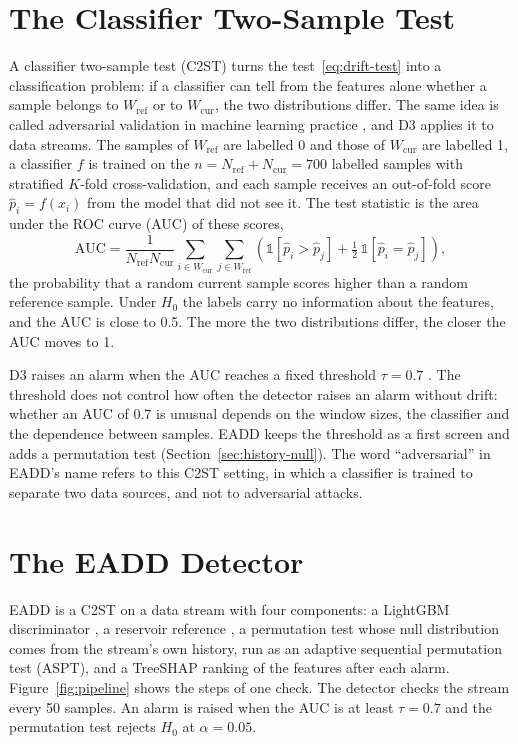 \section{The Classifier Two-Sample Test}
\label{sec:c2st}
A classifier two-sample test (C2ST) \citep{LopezPazOquab2017} turns the test~\eqref{eq:drift-test} into a classification problem: if a classifier can tell from the features alone whether a sample belongs to $W_{\mathrm{ref}}$ or to $W_{\mathrm{cur}}$, the two distributions differ. The same idea is called adversarial validation in machine learning practice \citep{Pan2020}, and D3 \citep{Gozuacik2019} applies it to data streams. The samples of $W_{\mathrm{ref}}$ are labelled 0 and those of $W_{\mathrm{cur}}$ are labelled 1, a classifier $f$ is trained on the $n = N_{\mathrm{ref}} + N_{\mathrm{cur}} = 700$ labelled samples with stratified $K$-fold cross-validation, and each sample receives an out-of-fold score $\hat{p}_i = f(x_i)$ from the model that did not see it. The test statistic is the area under the ROC curve (AUC) of these scores,
\begin{equation}
\mathrm{AUC} = \frac{1}{N_{\mathrm{ref}} N_{\mathrm{cur}}} \sum_{i \in W_{\mathrm{cur}}} \sum_{j \in W_{\mathrm{ref}}} \left( \mathbb{1}[\hat{p}_i > \hat{p}_j] + \tfrac{1}{2}\,\mathbb{1}[\hat{p}_i = \hat{p}_j] \right),
\label{eq:auc}
\end{equation}
the probability that a random current sample scores higher than a random reference sample. Under $H_0$ the labels carry no information about the features, and the AUC is close to 0.5. The more the two distributions differ, the closer the AUC moves to 1.

D3 raises an alarm when the AUC reaches a fixed threshold $\tau = 0.7$ \citep{Gozuacik2019}. The threshold does not control how often the detector raises an alarm without drift: whether an AUC of 0.7 is unusual depends on the window sizes, the classifier and the dependence between samples. EADD keeps the threshold as a first screen and adds a permutation test (Section~\ref{sec:history-null}). The word ``adversarial'' in EADD's name refers to this C2ST setting, in which a classifier is trained to separate two data sources, and not to adversarial attacks.

\section{The EADD Detector}
\label{sec:eadd}
EADD is a C2ST on a data stream with four components: a LightGBM discriminator \citep{Ke2017}, a reservoir reference \citep{Vitter1985}, a permutation test whose null distribution comes from the stream's own history, run as an adaptive sequential permutation test (ASPT), and a TreeSHAP ranking \citep{LundbergInteraction2020} of the features after each alarm. Figure~\ref{fig:pipeline} shows the steps of one check. The detector checks the stream every 50 samples. An alarm is raised when the AUC is at least $\tau = 0.7$ and the permutation test rejects $H_0$ at $\alpha = 0.05$.


